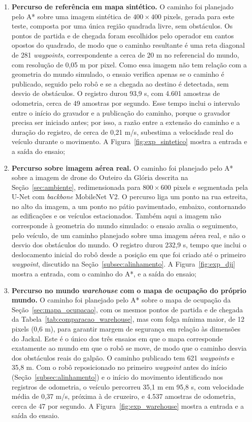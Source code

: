 \documentclass[
    12pt,
    openright,
    oneside,
    a4paper,
    english,
    brazil
]{abntex2}
\begin{document}
\begin{enumerate}
    \item \textbf{Percurso de referência em mapa sintético.} O caminho foi planejado pelo A* sobre uma imagem sintética de $400 \times 400$ pixels, gerada para este teste, composta por uma única região quadrada livre, sem obstáculos. Os pontos de partida e de chegada foram escolhidos pelo operador em cantos opostos do quadrado, de modo que o caminho resultante é uma reta diagonal de 281 \textit{waypoints}, correspondente a cerca de 20 m no referencial do mundo, com resolução de 0,05 m por pixel. Como essa imagem não tem relação com a geometria do mundo simulado, o ensaio verifica apenas se o caminho é publicado, seguido pelo robô e se a chegada ao destino é detectada, sem desvio de obstáculos. O registro durou 93,9 s, com 4.601 amostras de odometria, cerca de 49 amostras por segundo. Esse tempo inclui o intervalo entre o início do gravador e a publicação do caminho, porque o gravador precisa ser iniciado antes; por isso, a razão entre a extensão do caminho e a duração do registro, de cerca de 0,21 m/s, subestima a velocidade real do veículo durante o movimento. A Figura~\ref{fig:exp_sintetico} mostra a entrada e a saída do ensaio;
    \item \textbf{Percurso sobre imagem aérea real.} O caminho foi planejado pelo A* sobre a imagem de drone do Outeiro da Glória descrita na Seção~\ref{sec:ambiente}, redimensionada para $800 \times 600$ pixels e segmentada pela U-Net com \textit{backbone} MobileNet V2. O percurso liga um ponto na rua estreita, no alto da imagem, a um ponto no pátio pavimentado, embaixo, contornando as edificações e os veículos estacionados. Também aqui a imagem não corresponde à geometria do mundo simulado: o ensaio avalia o seguimento, pelo veículo, de um caminho planejado sobre uma imagem aérea real, e não o desvio dos obstáculos do mundo. O registro durou 232,9 s, tempo que inclui o deslocamento inicial do robô desde a posição em que foi criado até o primeiro \textit{waypoint}, discutido na Seção~\ref{subsec:alinhamento}. A Figura~\ref{fig:exp_dji} mostra a entrada, com o caminho do A*, e a saída do ensaio;
    \item \textbf{Percurso no mundo \textit{warehouse} com o mapa de ocupação do próprio mundo.} O caminho foi planejado pelo A* sobre o mapa de ocupação da Seção~\ref{sec:mapa_ocupacao}, com os mesmos pontos de partida e de chegada da Tabela~\ref{tab:comparacao_warehouse}, mas com folga mínima maior, de 12 pixels (0,6 m), para garantir margem de segurança em relação às dimensões do Jackal. Este é o único dos três ensaios em que o mapa corresponde exatamente ao mundo em que o robô se move, de modo que o caminho desvia dos obstáculos reais do galpão. O caminho publicado tem 621 \textit{waypoints} e 35,8 m. Com o robô reposicionado no primeiro \textit{waypoint} antes do início (Seção~\ref{subsec:alinhamento}) e o início do movimento identificado nos registros de odometria, o veículo percorreu 35,1 m em 95,8 s, com velocidade média de 0,37 m/s, próxima à de cruzeiro, e 4.537 amostras de odometria, cerca de 47 por segundo. A Figura~\ref{fig:exp_warehouse} mostra a entrada e a saída do ensaio.
\end{enumerate}
\end{document}
